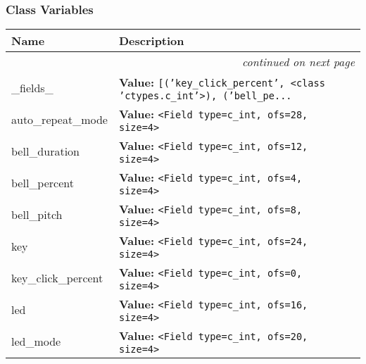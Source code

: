
  \subsubsection{Class Variables}

    \vspace{-1cm}
\hspace{\varindent}\begin{longtable}{|p{\varnamewidth}|p{\vardescrwidth}|l}
\cline{1-2}
\cline{1-2} \centering \textbf{Name} & \centering \textbf{Description}& \\
\cline{1-2}
\endhead\cline{1-2}\multicolumn{3}{r}{\small\textit{continued on next page}}\\\endfoot\cline{1-2}
\endlastfoot\raggedright \_\-f\-i\-e\-l\-d\-s\-\_\- & \raggedright \textbf{Value:} 
{\tt \texttt{[}\texttt{(}\texttt{'}\texttt{key\_click\_percent}\texttt{'}\texttt{, }{\textless}class 'ctypes.c\_int'{\textgreater}\texttt{)}\texttt{, }\texttt{(}\texttt{'}\texttt{bell\_pe}\texttt{...}}&\\
\cline{1-2}
\raggedright a\-u\-t\-o\-\_\-r\-e\-p\-e\-a\-t\-\_\-m\-o\-d\-e\- & \raggedright \textbf{Value:} 
{\tt {\textless}Field type=c\_int, ofs=28, size=4{\textgreater}}&\\
\cline{1-2}
\raggedright b\-e\-l\-l\-\_\-d\-u\-r\-a\-t\-i\-o\-n\- & \raggedright \textbf{Value:} 
{\tt {\textless}Field type=c\_int, ofs=12, size=4{\textgreater}}&\\
\cline{1-2}
\raggedright b\-e\-l\-l\-\_\-p\-e\-r\-c\-e\-n\-t\- & \raggedright \textbf{Value:} 
{\tt {\textless}Field type=c\_int, ofs=4, size=4{\textgreater}}&\\
\cline{1-2}
\raggedright b\-e\-l\-l\-\_\-p\-i\-t\-c\-h\- & \raggedright \textbf{Value:} 
{\tt {\textless}Field type=c\_int, ofs=8, size=4{\textgreater}}&\\
\cline{1-2}
\raggedright k\-e\-y\- & \raggedright \textbf{Value:} 
{\tt {\textless}Field type=c\_int, ofs=24, size=4{\textgreater}}&\\
\cline{1-2}
\raggedright k\-e\-y\-\_\-c\-l\-i\-c\-k\-\_\-p\-e\-r\-c\-e\-n\-t\- & \raggedright \textbf{Value:} 
{\tt {\textless}Field type=c\_int, ofs=0, size=4{\textgreater}}&\\
\cline{1-2}
\raggedright l\-e\-d\- & \raggedright \textbf{Value:} 
{\tt {\textless}Field type=c\_int, ofs=16, size=4{\textgreater}}&\\
\cline{1-2}
\raggedright l\-e\-d\-\_\-m\-o\-d\-e\- & \raggedright \textbf{Value:} 
{\tt {\textless}Field type=c\_int, ofs=20, size=4{\textgreater}}&\\
\cline{1-2}
\end{longtable}

